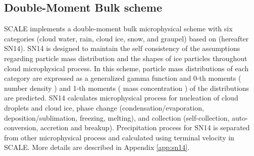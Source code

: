 \subsection{Double-Moment Bulk scheme}

SCALE implements a double-moment bulk microphysical scheme with six categories (cloud water, rain, cloud ice, snow, and graupel) 
based on \cite{sn_2014} (hereafter SN14).
SN14 is designed to maintain the self consistency of the assumptions regarding particle mass distribution and
the shapes of ice particles throughout cloud microphysical process.
In this scheme, particle mass distributions of each category are expressed as a generalized gamma function and 0-th moments ( number density ) and
1-th moments ( mass concentration ) of the distributions are predicted. 
SN14 calculates microphysical process for nucleation of cloud droplets and cloud ice,
phase change (condensation/evaporation, deposition/sublimation, freezing, melting), and
collection (self-collection, auto-conversion, accretion and breakup).
Precipitation process for SN14 is separated from other microphysical process and calculated using terminal velocity in SCALE.
More details are described in Appendix \ref{app:sn14}.
